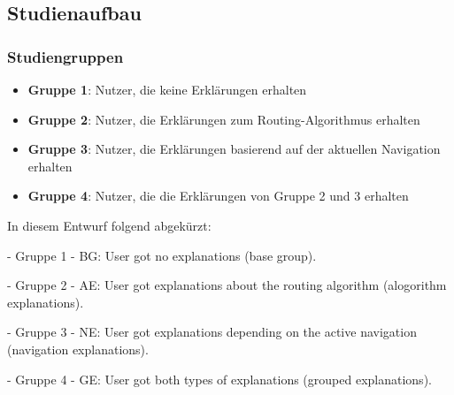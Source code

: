 \subsection{Studienaufbau}

\subsubsection*{Studiengruppen}

\begin{itemize}
    \item \textbf{Gruppe 1}: Nutzer, die keine Erklärungen erhalten
    \item \textbf{Gruppe 2}: Nutzer, die Erklärungen zum Routing-Algorithmus erhalten
    \item \textbf{Gruppe 3}: Nutzer, die Erklärungen basierend auf der aktuellen Navigation erhalten
    \item \textbf{Gruppe 4}: Nutzer, die die Erklärungen von Gruppe 2 und 3 erhalten
\end{itemize}

In diesem Entwurf folgend abgekürzt:

- Gruppe 1 - BG: User got no explanations (base group).

- Gruppe 2 - AE: User got explanations about the routing algorithm (alogorithm explanations).

- Gruppe 3 - NE: User got explanations depending on the active navigation (navigation explanations).

- Gruppe 4 - GE: User got both types of explanations (grouped explanations).
